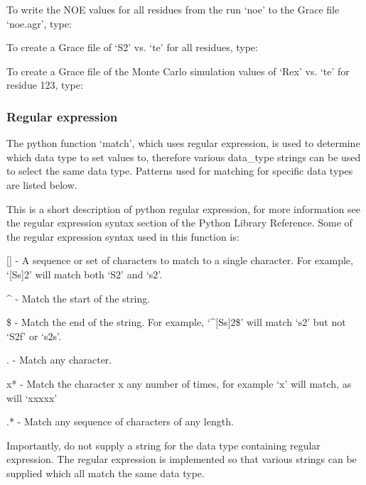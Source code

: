 To write the NOE values for all residues from the run `noe' to the Grace file `noe.agr',
type:



To create a Grace file of `S2' vs. `te' for all residues, type:




To create a Grace file of the Monte Carlo simulation values of `Rex' vs. `te' for residue
123, type:






\subsubsection{Regular expression}

The python function `match', which uses regular expression, is used to determine which data
type to set values to, therefore various data\_type strings can be used to select the same
data type.  Patterns used for matching for specific data types are listed below.

This is a short description of python regular expression, for more information see the
regular expression syntax section of the Python Library Reference.  Some of the regular
expression syntax used in this function is:

    [] - A sequence or set of characters to match to a single character.  For example,
    `[Ss]2' will match both `S2' and `s2'.

    \^{} - Match the start of the string.

    \$ - Match the end of the string.  For example, `\^{}[Ss]2\$' will match `s2' but not `S2f'
    or `s2s'.

    . - Match any character.

    x* - Match the character x any number of times, for example `x' will match, as will
    `xxxxx'

    .* - Match any sequence of characters of any length.

Importantly, do not supply a string for the data type containing regular expression.  The
regular expression is implemented so that various strings can be supplied which all match
the same data type.


